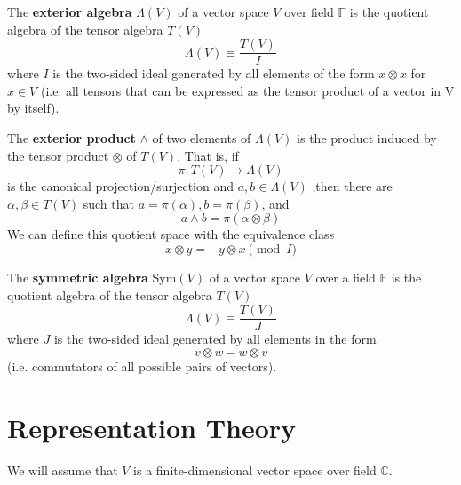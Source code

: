 \documentclass{article}
\begin{document}
  \begin{definition}
    The \textbf{exterior algebra} $\Lambda(V)$ of a vector space $V$ over field $\mathbb{F}$ is the quotient algebra of the tensor algebra $T(V)$
    \begin{equation}
      \Lambda(V) \equiv \frac{T(V)}{I}
    \end{equation}
    where $I$ is the two-sided ideal generated by all elements of the form $x \otimes x$ for $x \in V$ (i.e. all tensors that can be expressed as the tensor product of a vector in V by itself). 

    The \textbf{exterior product} $\wedge$ of two elements of $\Lambda(V)$ is the product induced by the tensor product $\otimes$ of $T(V)$. That is, if 
    \begin{equation}
      \pi: T(V) \longrightarrow \Lambda(V)
    \end{equation}
    is the canonical projection/surjection and $a, b \in \Lambda(V)$ ,then there are $\alpha, \beta \in T(V)$ such that $a = \pi(\alpha), b = \pi(\beta)$, and 
    \begin{equation}
      a \wedge b = \pi(\alpha \otimes \beta)
    \end{equation}
    We can define this quotient space with the equivalence class
    \begin{equation}
      x \otimes y = - y \otimes x \pmod{I}
    \end{equation}
  \end{definition}

  \begin{definition}
    The \textbf{symmetric algebra} Sym$(V)$ of a vector space $V$ over a field $\mathbb{F}$ is the quotient algebra of the tensor algebra $T(V)$ 
    \begin{equation}
      \Lambda(V) \equiv \frac{T(V)}{J}
    \end{equation}
    where $J$ is the two-sided ideal generated by all elements in the form 
    \begin{equation}
      v \otimes w - w \otimes v
    \end{equation}
    (i.e. commutators of all possible pairs of vectors). 
  \end{definition}

\section{Representation Theory}

  We will assume that $V$ is a finite-dimensional vector space over field $\mathbb{C}$. 
\end{document}
